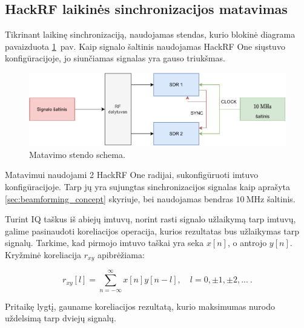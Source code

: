 \documentclass[main.tex]{subfiles}
\begin{document}
\subsection{HackRF laikinės sinchronizacijos matavimas}\label{sec:time_sync}

Tikrinant laikinę sinchronizaciją, naudojamas stendas, kurio
blokinė diagrama pavaizduota \ref{fig:measurement_stand}~pav.
Kaip signalo šaltinis naudojamas HackRF One siųstuvo konfigūracijoje,
jo siunčiamas signalas yra gauso triukšmas.

\begin{figure}[h]
    \begin{centering}
    \includegraphics[scale=0.9]{drawings/measurement_stand}
    \par\end{centering}
    \protect\caption{\label{fig:measurement_stand}Matavimo stendo schema.}
\end{figure}

Matavimui naudojami 2 HackRF One radijai, sukonfigūruoti imtuvo konfigūracijoje.
Tarp jų yra sujungtas sinchronizacijos signalas kaip aprašyta \ref{sec:beamforming_concept}
skyriuje, bei naudojamas bendras $10\ \mathrm{MHz}$ šaltinis.

Turint IQ taškus iš abiejų imtuvų, norint rasti signalo užlaikymą tarp imtuvų, galime
pasinaudoti koreliacijos operacija, kurios rezultatas bus užlaikymas tarp signalų.
Tarkime, kad pirmojo imtuvo taškai yra seka $x[n]$, o antrojo $y[n]$. Kryžminė
koreliacija $r_{xy}$ apibrėžiama:

\begin{equation}
    r_{xy}[l] = \sum_{n=-\infty}^\infty x[n]y[n-l],\quad l=0,\pm 1, \pm 2,...\ .
    \label{eq:corelation}
\end{equation}

\noindent Pritaikę  lygtį, gauname koreliacijos rezultatą, kurio
maksimumas nurodo uždelsimą tarp dviejų signalų.
\end{document}
